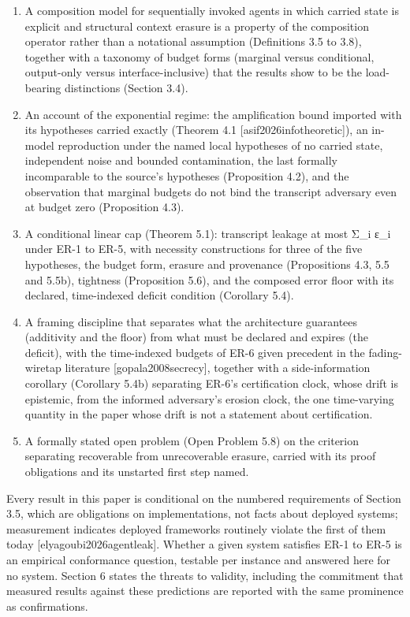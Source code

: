 \documentclass[
  11pt,
]{article}
\begin{document}
\begin{enumerate}
\def\labelenumi{\arabic{enumi}.}
\item
  A composition model for sequentially invoked agents in which carried
  state is explicit and structural context erasure is a property of the
  composition operator rather than a notational assumption (Definitions
  3.5 to 3.8), together with a taxonomy of budget forms (marginal versus
  conditional, output-only versus interface-inclusive) that the results
  show to be the load-bearing distinctions (Section 3.4).
\item
  An account of the exponential regime: the amplification bound imported
  with its hypotheses carried exactly (Theorem 4.1
  {[}asif2026infotheoretic{]}), an in-model reproduction under the named
  local hypotheses of no carried state, independent noise and bounded
  contamination, the last formally incomparable to the source's
  hypotheses (Proposition 4.2), and the observation that marginal
  budgets do not bind the transcript adversary even at budget zero
  (Proposition 4.3).
\item
  A conditional linear cap (Theorem 5.1): transcript leakage at most
  Σ\_i ε\_i under ER-1 to ER-5, with necessity constructions for three
  of the five hypotheses, the budget form, erasure and provenance
  (Propositions 4.3, 5.5 and 5.5b), tightness (Proposition 5.6), and the
  composed error floor with its declared, time-indexed deficit condition
  (Corollary 5.4).
\item
  A framing discipline that separates what the architecture guarantees
  (additivity and the floor) from what must be declared and expires (the
  deficit), with the time-indexed budgets of ER-6 given precedent in the
  fading-wiretap literature {[}gopala2008secrecy{]}, together with a
  side-information corollary (Corollary 5.4b) separating ER-6's
  certification clock, whose drift is epistemic, from the informed
  adversary's erosion clock, the one time-varying quantity in the paper
  whose drift is not a statement about certification.
\item
  A formally stated open problem (Open Problem 5.8) on the criterion
  separating recoverable from unrecoverable erasure, carried with its
  proof obligations and its unstarted first step named.
\end{enumerate}

Every result in this paper is conditional on the numbered requirements
of Section 3.5, which are obligations on implementations, not facts
about deployed systems; measurement indicates deployed frameworks
routinely violate the first of them today {[}elyagoubi2026agentleak{]}.
Whether a given system satisfies ER-1 to ER-5 is an empirical
conformance question, testable per instance and answered here for no
system. Section 6 states the threats to validity, including the
commitment that measured results against these predictions are reported
with the same prominence as confirmations.
\end{document}
